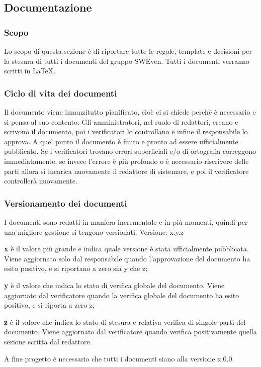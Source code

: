 \subsection{Documentazione}
\subsubsection{Scopo}
Lo scopo di questa sezione è di riportare tutte le regole, template e decisioni 
per la stesura di tutti i documenti del gruppo SWEven. \newline
Tutti i documenti verranno scritti in \LaTeX.

\subsubsection{Ciclo di vita dei documenti}
Il documento viene innanzitutto pianificato, cioè ci si chiede perchè è necessario e si pensa al suo contento. 
Gli amministratori, nel ruolo di redattori, creano e scrivono il documento, poi i verificatori lo controllano 
e infine il responsabile lo approva. A quel punto il documento è finito e pronto ad essere ufficialmente 
pubblicato. \newline
Se i verificatori trovano errori superficiali e/o di ortografia correggono immediatamente;
se invece l'errore è più profondo o è necessario riscrivere delle parti allora si
incarica nuovamente il redattore di sistemare, e poi il verificatore controllerà nuovamente.

\subsubsection{Versionamento dei documenti}
I documenti sono redatti in maniera incrementale e in più momenti, quindi per una migliore 
gestione si tengono versionati.
\newline Versione: x.y.z
\begin{description}
    \item \textbf{x} è il valore più grande e indica quale versione è stata ufficialmente pubblicata.
            Viene aggiornato solo dal responsabile quando l'approvazione del documento ha esito positivo,
            e si riportano a zero sia y che z;
    \item \textbf{y} è il valore che indica lo stato di verifica globale del documento. Viene aggiornato dal verificatore 
            quando la verifica globale del documento ha esito positivo, e si riporta a zero z;
    \item \textbf{z} è il valore che indica lo stato di stesura e relativa verifica di singole parti del documento. 
            Viene aggiornato dal verificatore quando verifica positivamente quella sezione scritta dal redattore.
\end{description}
A fine progetto è necessario che tutti i documenti siano alla versione x.0.0.

